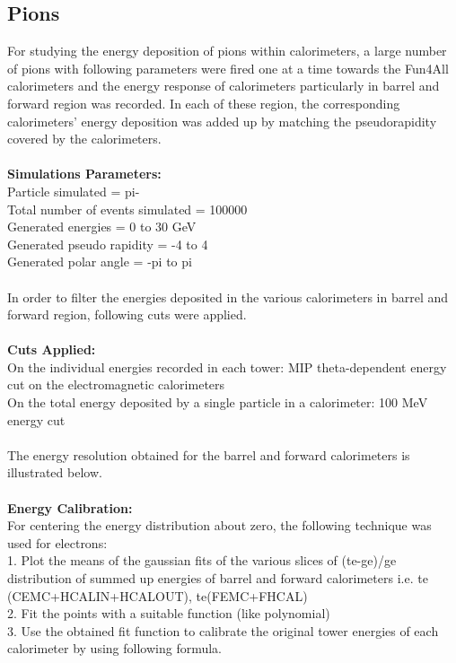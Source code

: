 \subsection{Pions}
For studying the energy deposition of pions within calorimeters, a large number of pions with following parameters were fired one at a time towards the Fun4All 
calorimeters and the energy response of   calorimeters particularly in barrel and forward region was recorded. In each of these region, the corresponding calorimeters' energy deposition was added up by matching the pseudorapidity covered by the calorimeters. \\
\\
\textbf{Simulations Parameters:}\\
Particle simulated = pi-\\
Total number of events simulated = 100000\\
Generated energies = 0 to 30 GeV \\
Generated pseudo rapidity = -4 to 4\\
Generated polar angle = -pi to pi\\
\\
In order to filter the energies deposited in the various calorimeters in barrel and forward region, following cuts were applied.\\
\\
\textbf{Cuts Applied:}\\
On the individual energies recorded in each tower: MIP theta-dependent energy cut on the electromagnetic calorimeters \\
On the total energy deposited by a single particle in a calorimeter: 100 MeV energy cut\\
\\
The energy resolution obtained for the barrel and forward calorimeters is illustrated below.\\
\\
\textbf{Energy Calibration:}\\
For centering the energy distribution about zero, the following technique was used for electrons:\\
1. Plot the means of the gaussian fits of the various slices of (te-ge)/ge distribution of summed up energies of barrel and forward calorimeters i.e. te (CEMC+HCALIN+HCALOUT), te(FEMC+FHCAL)\\
2. Fit the points with a suitable function (like polynomial)\\
3. Use the obtained fit function to calibrate the original tower energies of each calorimeter by using following formula.\\
